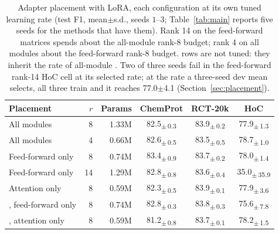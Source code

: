 \begin{table}[t]
\centering
\caption{Adapter placement with LoRA, each configuration at its own tuned learning rate (test F1, mean$\pm$s.d., seeds $1$--$3$; Table~\ref{tab:main} reports five seeds for the methods that have them). Rank 14 on the feed-forward matrices spends about the all-module rank-8 budget; rank 4 on all modules about the feed-forward rank-8 budget. \method{} rows are not tuned: they inherit the rate of all-module \method{}. Two of three seeds fail in the feed-forward rank-14 HoC cell at its selected rate; at the rate a three-seed dev mean selects, all three train and it reaches 77.0$\pm$4.1 (Section~\ref{sec:placement}).}
\label{tab:placement}
\footnotesize
\setlength{\tabcolsep}{3pt}
\begin{tabular}{lrrccc}
\toprule
Placement & $r$ & Params & ChemProt & RCT-20k & HoC \\
\midrule
All modules & 8 & 1.33M & 82.5\textsubscript{$\pm$\,0.3} & 83.9\textsubscript{$\pm$\,0.2} & 77.9\textsubscript{$\pm$\,1.3} \\
All modules & 4 & 0.66M & 82.6\textsubscript{$\pm$\,0.5} & 83.5\textsubscript{$\pm$\,0.5} & 78.7\textsubscript{$\pm$\,1.0} \\
Feed-forward only & 8 & 0.74M & 83.4\textsubscript{$\pm$\,0.9} & 83.7\textsubscript{$\pm$\,0.2} & 78.0\textsubscript{$\pm$\,1.4} \\
Feed-forward only & 14 & 1.29M & 82.8\textsubscript{$\pm$\,0.8} & 83.6\textsubscript{$\pm$\,0.4} & 35.0\textsubscript{$\pm$\,35.9} \\
Attention only & 8 & 0.59M & 82.3\textsubscript{$\pm$\,0.5} & 83.9\textsubscript{$\pm$\,0.1} & 77.9\textsubscript{$\pm$\,3.6} \\
\midrule
\method{}, feed-forward only & 8 & 0.74M & 82.8\textsubscript{$\pm$\,0.3} & 83.8\textsubscript{$\pm$\,0.3} & 75.6\textsubscript{$\pm$\,7.8} \\
\method{}, attention only & 8 & 0.59M & 81.2\textsubscript{$\pm$\,0.8} & 83.7\textsubscript{$\pm$\,0.1} & 78.2\textsubscript{$\pm$\,1.5} \\
\bottomrule
\end{tabular}
\end{table}
